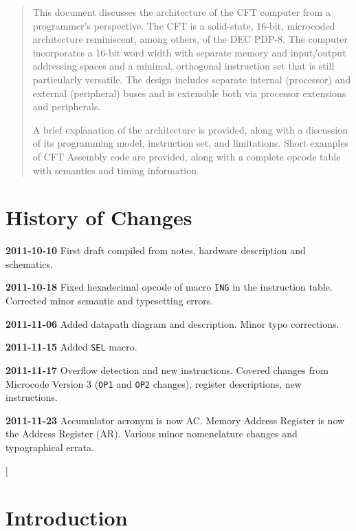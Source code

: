 \documentclass[11pt,a4paper,twocolumns]{article}
\newcommand\register[1]{\textsf{#1}}
\newcommand\A{\register{AC}}
\newcommand\AR{\register{AR}}
\begin{document}
\begin{minipage}{.75\textwidth}
  \begin{abstract}
    \small
    
  This document discusses the architecture of the CFT computer from a
  programmer's perspective. The CFT is a solid-state, 16-bit,
  microcoded architecture reminiscent, among others, of the DEC
  PDP-8. The computer incorporates a 16-bit word width with separate
  memory and input/output addressing spaces and a minimal, orthogonal
  instruction set that is still particularly versatile. The design
  includes separate internal (processor) and external (peripheral)
  buses and is extensible both via processor extensions and
  peripherals.

  A brief explanation of the architecture is provided, along with a
  discussion of its programming model, instruction set, and
  limitations. Short examples of CFT Assembly code are provided, along
  with a complete opcode table with semantics and timing information.
    
  \end{abstract}
  
  \section*{History of Changes}
  \small

  {\bf 2011-10-10} First draft compiled from notes, hardware description
  and schematics.

  {\bf 2011-10-18} Fixed hexadecimal opcode of macro {\tt ING} in the
  instruction table. Corrected minor semantic and typesetting errors.
  
  {\bf 2011-11-06} Added datapath diagram and description. Minor typo
  corrections.

  {\bf 2011-11-15} Added {\tt SEL} macro.

  {\bf 2011-11-17} Overflow detection and new instructions. Covered
  changes from Microcode Version 3 ({\tt OP1} and {\tt OP2} changes),
  register descriptions, new instructions.

  {\bf 2011-11-23} Accumulator acronym is now \A. Memory Address
  Register is now the Address Register (\AR). Various minor
  nomenclature changes and typographical errata.

  \vspace{5ex}
  
\end{minipage}
] %
\section{Introduction}
\end{document}
